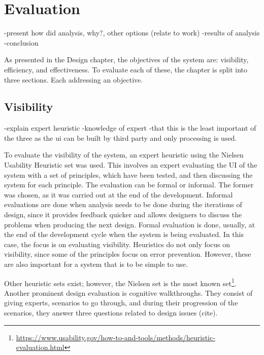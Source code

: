 \chapter{Evaluation}
-present how did analysis, why?, other options (relate to work)
-results of analysis
-conclusion
\par As presented in the Design chapter, the objectives of the system are: visibility, efficiency, and effectiveness. To evaluate each of these, the chapter is split into three sections. Each addressing an objective.

\section{Visibility}
-explain expert heuristic
-knowledge of expert
-that this is the least important of the three as the ui can be built by third party and only processing is used.

\par To evaluate the visibility of the system, an expert heuristic using the Nielsen Usability Heuristic \cite{nielsen1995} set was used. This involves an expert evaluating the UI of the system with a set of principles, which have been tested, and then discussing the system for each principle. The evaluation can be formal or informal. The former was chosen, as it was carried out at the end of the development. Informal evaluations are done when analysis needs to be done during the iterations of design, since it provides feedback quicker and allows designers to discuss the problems when producing the next design. Formal evaluation is done, usually, at the end of the development cycle when the system is being evaluated. In this case, the focus is on evaluating visibility. Heuristics do not only focus on visibility, since some of the principles focus on error prevention. However, these are also important for a system that is to be simple to use.

\par Other heuristic sets exist; however, the Nielsen set is the most known set\footnote{\url{https://www.usability.gov/how-to-and-tools/methods/heuristic-evaluation.html}}. Another prominent design evaluation is cognitive walkthroughs. They consist of giving experts, scenarios to go through, and during their progression of the scenarios, they  answer three questions related to design issues (cite).


